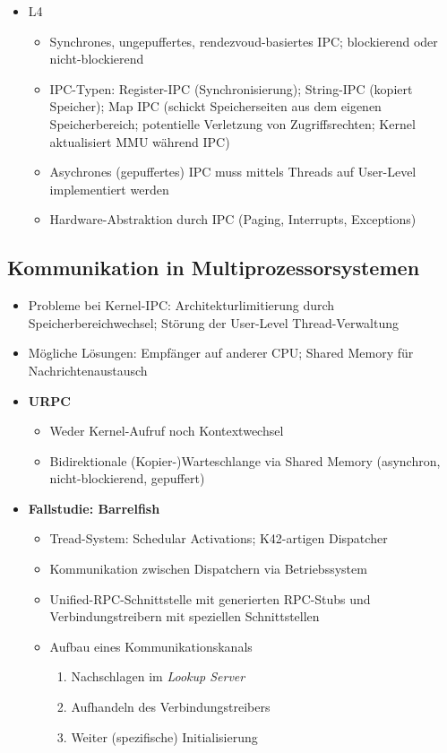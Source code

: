 \begin{itemize}
\begin{itemize}
\begin{itemize}
		\end{itemize}
		\item L4
		\begin{itemize}
			\item Synchrones, ungepuffertes, rendezvoud-basiertes IPC; blockierend oder nicht-blockierend
			\item IPC-Typen: Register-IPC (Synchronisierung); String-IPC (kopiert Speicher); Map IPC (schickt Speicherseiten aus dem eigenen Speicherbereich; potentielle Verletzung von Zugriffsrechten; Kernel aktualisiert MMU während IPC)
			\item Asychrones (gepuffertes) IPC muss mittels Threads auf User-Level implementiert werden
			\item Hardware-Abstraktion durch IPC (Paging, Interrupts, Exceptions)
		\end{itemize}
	\end{itemize}
\end{itemize}


\subsection{Kommunikation in Multiprozessorsystemen}
\begin{itemize}
	\item Probleme bei Kernel-IPC: Architekturlimitierung durch Speicherbereichwechsel; Störung der User-Level Thread-Verwaltung
	\item Mögliche Lösungen: Empfänger auf anderer CPU; Shared Memory für Nachrichtenaustausch
	\item \textbf{URPC}
	\begin{itemize}
		\item Weder Kernel-Aufruf noch Kontextwechsel
		\item Bidirektionale (Kopier-)Warteschlange via Shared Memory (asynchron, nicht-blockierend, gepuffert)
	\end{itemize}
	\item \textbf{Fallstudie: Barrelfish}
	\begin{itemize}
		\item Tread-System: Schedular Activations; K42-artigen Dispatcher
		\item Kommunikation zwischen Dispatchern via Betriebssystem
		\item Unified-RPC-Schnittstelle mit generierten RPC-Stubs und Verbindungstreibern mit speziellen Schnittstellen
		\item Aufbau eines Kommunikationskanals
		\begin{enumerate}
			\item Nachschlagen im \textit{Lookup Server}
			\item Aufhandeln des Verbindungstreibers
			\item Weiter (spezifische) Initialisierung
		\end{enumerate}
	\end{itemize}
\end{itemize}



